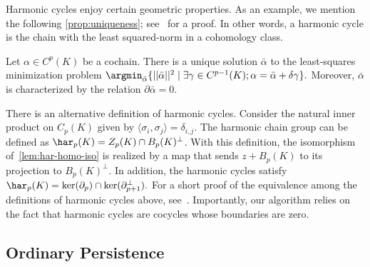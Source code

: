 Harmonic cycles enjoy certain geometric properties. As an example, we mention the following \cref{prop:uniqueness}; see~\cite[Proposition 3]{DeSilvaMorozovVejdemoJohansson2011} for a proof. In other words, a harmonic cycle is the chain with the least squared-norm in a cohomology class.

\begin{proposition}
\label{prop:uniqueness}
Let $\alpha \in C^p(K)$ be a cochain. There is a unique solution $\bar{\alpha}$ to the least-squares minimization problem 
$\argmin_{\bar{\alpha}} \{ || \bar{\alpha}||^2 \mid \exists \gamma \in C^{p-1}(K);  \alpha = \bar{\alpha}+\delta \gamma \}.$ 
Moreover, $\bar{\alpha}$ is characterized by the relation $\partial {\bar{\alpha}}=0$.
\end{proposition}

There is an alternative definition of harmonic cycles. Consider the natural inner product on $C_p(K)$ given by $\langle\sigma_i , \sigma_j\rangle = \delta_{i,j}$. The harmonic chain group can be defined as $\har_p(K) = Z_p(K) \cap B_p(K)^\perp$. With this definition, the isomorphism of~\cref{lem:har-homo-iso} is realized by a  map that sends $z+B_p(K)$ to its projection to $B_p(K)^\perp$. In addition, the harmonic cycles satisfy 
$\har_p(K) = \ker(\partial_p) \cap \ker(\partial_{p+1}^\perp).$
For a short proof of the equivalence among the definitions of harmonic cycles above, see~\cite{BasuCox2022}. 
Importantly, our algorithm relies on the fact that harmonic cycles are cocycles whose boundaries are zero. 

\subsection{Ordinary Persistence}
\label{sec:persistence}


